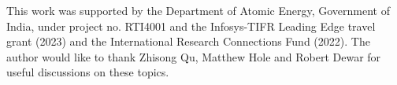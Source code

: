 This work was supported by the Department of Atomic Energy, Government of India, under project no. RTI4001 and the Infosys-TIFR Leading Edge travel grant (2023) and the International Research Connections Fund (2022). The author would like to thank Zhisong Qu, Matthew Hole and Robert Dewar for useful discussions on these topics.